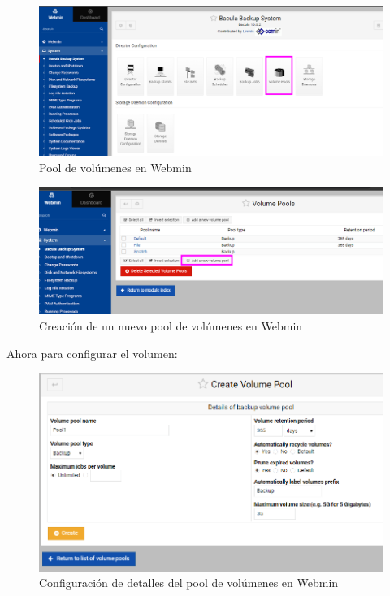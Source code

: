 \begin{minipage}[t]{0.45\textwidth}
    \vspace{0pt} %
    \begin{figure}[H]
        \centering
        \includegraphics[width=0.95\linewidth]{instalacionBacula/pollv.png}
        \caption{Pool de volúmenes en Webmin}
    \end{figure} 
    \end{minipage}%
    \hfill %
    \begin{minipage}[t]{0.45\textwidth}
    \vspace{0pt} %
    \centering %
    \begin{figure}[H]
        \centering
        \includegraphics[width=0.95\linewidth]{instalacionBacula/pool22.png}
        \caption{Creación de un nuevo pool de volúmenes en Webmin}
    \end{figure}
    \end{minipage}
    
\medskip






Ahora para  configurar el volumen:
\begin{figure}[H]
    \centering
    \includegraphics[width=0.5\linewidth]{instalacionBacula/createVolumePool.png}
    \caption{Configuración de detalles del pool de volúmenes en Webmin}
\end{figure}